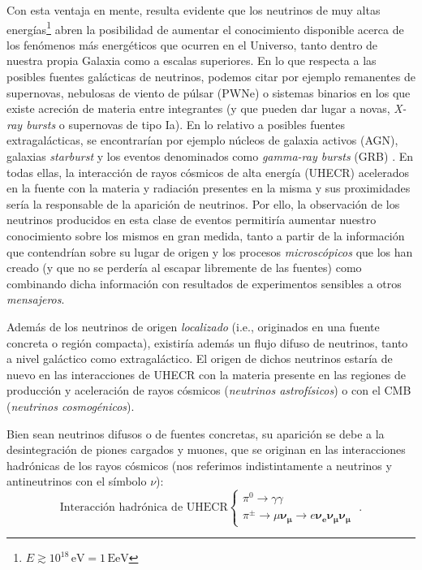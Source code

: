 \documentclass[12 pt, a4paper]{article} %
\numberwithin{equation}{section}
\numberwithin{figure}{section}
\numberwithin{table}{section}
\begin{document}
	Con esta ventaja en mente, resulta evidente que los neutrinos de muy altas energías\footnote{ $E\gtrsim 10^{18}\,\mathrm{eV}=1\,\mathrm{EeV}$} abren la posibilidad de aumentar el conocimiento disponible acerca de los fenómenos más energéticos que ocurren en el Universo, tanto dentro de nuestra propia Galaxia como a escalas superiores. En lo que respecta a las posibles fuentes galácticas de neutrinos, podemos citar por ejemplo remanentes de supernovas, nebulosas de viento de púlsar (PWNe) o sistemas binarios en los que existe acreción de materia entre integrantes (y que pueden dar lugar a novas, \textit{X-ray bursts} o supernovas de tipo Ia). En lo relativo a posibles fuentes extragalácticas, se encontrarían por ejemplo núcleos de galaxia activos (AGN), galaxias \textit{starburst} y los eventos denominados como \textit{gamma-ray bursts} (GRB) \cite{gaisser2018neutrino, gaisser2016cosmic, gaisser1995particle}. En todas ellas, la interacción de rayos cósmicos de alta energía (UHECR) acelerados en la fuente con la materia y radiación presentes en la misma y sus proximidades sería la responsable de la aparición de neutrinos. Por ello, la observación de los neutrinos producidos en esta clase de eventos permitiría aumentar nuestro conocimiento sobre los mismos en gran medida, tanto a partir de la información que contendrían sobre su lugar de origen y los procesos \textit{microscópicos} que los han creado (y que no se perdería al escapar libremente de las fuentes) como combinando dicha información con resultados de experimentos sensibles a otros \textit{mensajeros}.
	
	Además de los neutrinos de origen \textit{localizado} (i.e., originados en una fuente concreta o región compacta), existiría además un flujo difuso de neutrinos, tanto a nivel galáctico como extragaláctico. El origen de dichos neutrinos estaría de nuevo en las interacciones de UHECR con la materia presente en las regiones de producción y aceleración de rayos cósmicos (\textit{neutrinos astrofísicos}) o con el CMB (\textit{neutrinos cosmogénicos}). 
	
	Bien sean neutrinos difusos o de fuentes concretas, su aparición se debe a la desintegración de piones cargados y muones, que se originan en las interacciones hadrónicas de los rayos cósmicos (nos referimos indistintamente a neutrinos y antineutrinos con el símbolo $\nu$):
	\begin{equation}
		\text{Interacción hadrónica de UHECR}\left\{\begin{array}{l}\pi^0\rightarrow \gamma\gamma\\\pi^\pm\rightarrow \mu \bm{\nu_\mu}\rightarrow e \bm{\nu_e \nu_\mu \nu_\mu} \end{array}\right.\;.\label{ec11}
	\end{equation}
	
\end{document}
